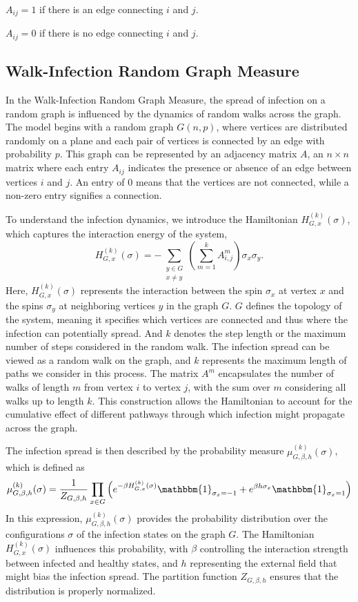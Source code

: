 \documentclass[11pt]{book}
\begin{document}
$A_{ij}=1$ if there is an edge connecting $i$ and $j$.

$A_{ij}=0$ if there is no edge connecting $i$ and $j$.


\subsection{Walk-Infection Random Graph Measure}

In the Walk-Infection Random Graph Measure, the spread of infection on a random graph is influenced by the dynamics of random walks across the graph. The model begins with a random graph $G(n, p)$, where vertices are distributed randomly on a plane and each pair of vertices is connected by an edge with probability $p$. This graph can be represented by an adjacency matrix $A$, an $n \times n$ matrix where each entry $A_{ij}$  indicates the presence or absence of an edge between vertices $i$ and $j$. An entry of $0$ means that the vertices are not connected, while a non-zero entry signifies a connection.

To understand the infection dynamics, we introduce the Hamiltonian $H^{(k)}_{G,x}(\sigma)$, which captures the interaction energy of the system,
$$
H^{(k)}_{G,x}(\sigma) = -\sum_{\substack{y\in G \\ x\neq y}} \left( \sum_{m=1}^k A^{m}_{i,j} \right)\sigma_x\sigma_y.
$$
Here, $H^{(k)}_{G,x}(\sigma)$ represents the interaction between the spin $\sigma_x$ at vertex $x$ and the spins  $\sigma_y$  at neighboring vertices $y$  in the graph $G$. $G$ defines the topology of the system, meaning it specifies which vertices are connected and thus where the infection can potentially spread. And $k$ denotes the step length or the maximum number of steps considered in the random walk. The infection spread can be viewed as a random walk on the graph, and $k$ represents the maximum length of paths we consider in this process. The matrix $A^m$ encapsulates the number of walks of length $m$ from vertex $i$ to vertex $j$, with the sum over $m$ considering all walks up to length $k$. This construction allows the Hamiltonian to account for the cumulative effect of different pathways through which infection might propagate across the graph.

The infection spread is then described by the probability measure $\mu^{(k)}_{G,\beta,h}(\sigma)$, which is defined as
$$
\mu^{(k)}_{G,\beta,h}(\sigma) = \frac{1}{Z_{G,\beta,h}} \prod_{x\in G} \left(e^{-\beta H^{(k)}_{G,x}(\sigma)}\mathbbm{1}_{\sigma_x=-1} + e^{\beta h \sigma_x}\mathbbm{1}_{\sigma_x=1}\right)
$$
In this expression, $\mu^{(k)}_{G,\beta,h}(\sigma)$ provides the probability distribution over the configurations $\sigma$ of the infection states on the graph $G$. The Hamiltonian $H^{(k)}_{G,x}(\sigma)$ influences this probability, with $\beta$ controlling the interaction strength between infected and healthy states, and $h$ representing the external field that might bias the infection spread. The partition function $Z_{G,\beta,h}$ ensures that the distribution is properly normalized.
\end{document}
